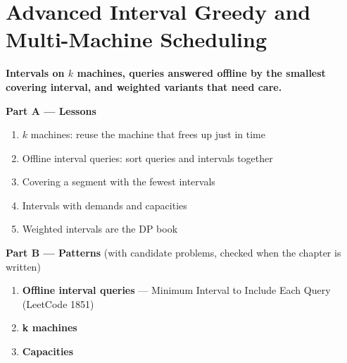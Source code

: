 \chapter{Advanced Interval Greedy and Multi-Machine Scheduling}
\label{ch:adv_intervals}

\begin{tcolorbox}[enhanced, colback=white, colframe=secondaryblue, boxrule=1pt, arc=2mm]
\textbf{\large\textcolor{primaryblue}{Intervals on $k$ machines, queries answered offline by the smallest covering interval, and weighted variants that need care.}}
\end{tcolorbox}


\begin{plannedbox}
\textbf{Part A --- Lessons}
\begin{enumerate}[leftmargin=*, label=\textbf{A\arabic*.}, itemsep=1pt]
    \item $k$ machines: reuse the machine that frees up just in time
    \item Offline interval queries: sort queries and intervals together
    \item Covering a segment with the fewest intervals
    \item Intervals with demands and capacities
    \item Weighted intervals are the DP book
\end{enumerate}
\textbf{Part B --- Patterns} (with candidate problems, checked when the chapter is written)
\begin{enumerate}[leftmargin=*, label=\textbf{P\arabic*.}, itemsep=1pt]
    \item \textbf{Offline interval queries} --- Minimum Interval to Include Each Query {\small\color{darkgray}(LeetCode 1851)}
    \item \textbf{k machines}
    \item \textbf{Capacities}
\end{enumerate}
\end{plannedbox}
